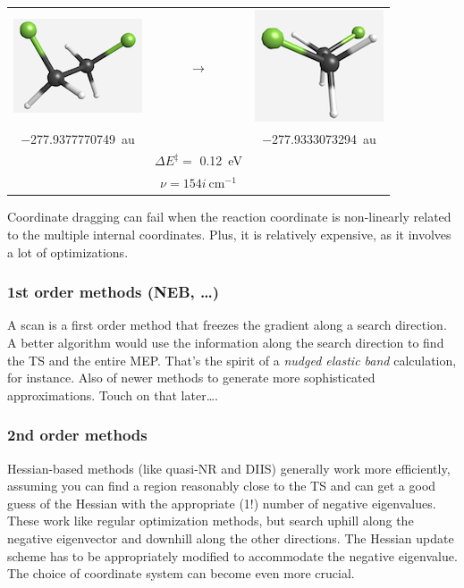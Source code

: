 \documentclass[11pt]{article}
\begin{document}
\begin{center}
\begin{tabular}{ccc}
\includegraphics{./Images/FCH2CH2F-gauche.png}
 & \(\longrightarrow\) & 
\includegraphics{./Images/FCH2CH2F-TS.png} \\
\SI{-277.9377770749}{au} &  & \SI{-277.9333073294}{au} \\
  &  \(\Delta E^\ddagger =\) \SI{0.12}{eV} &  \\
  &  \(\nu = 154i~\text{cm}^{-1}\) & \\
\end{tabular}
\end{center}

Coordinate dragging can fail when the reaction coordinate is non-linearly related to the multiple internal coordinates. Plus, it is relatively expensive, as it involves a lot of optimizations.
\subsubsection{1st order methods (NEB, \ldots{})}
\label{sec:org6c1b7ee}
A scan is a first order method that freezes the gradient along a search direction.  A better algorithm would use the information along the search direction to find the TS and the entire MEP.  That's the spirit of a \emph{nudged elastic band} calculation, for instance. Also of newer methods to generate more sophisticated approximations.   Touch on that later\ldots{}.
\subsubsection{2nd order methods}
\label{sec:org9548f9e}
Hessian-based methods (like quasi-NR and DIIS) generally work more efficiently, assuming you can find a region reasonably close to the TS and can get a good guess of the Hessian with the appropriate (1!) number of negative eigenvalues.  These work like regular optimization methods, but search uphill along the negative eigenvector and downhill along the other directions.  The Hessian update scheme has to be appropriately modified to accommodate the negative eigenvalue.  The choice of coordinate system can become even more crucial.
\end{document}
